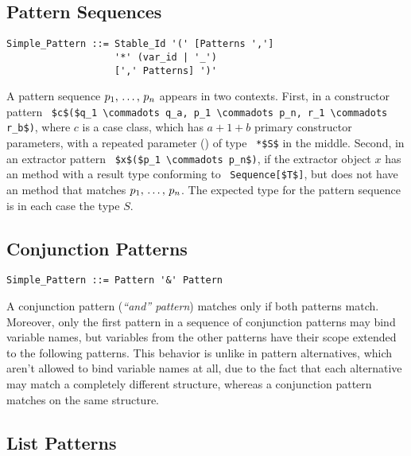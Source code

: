 \subsection{Pattern Sequences}
\label{sec:pattern-sequences}

\syntax\begin{lstlisting}
Simple_Pattern ::= Stable_Id '(' [Patterns ','] 
                   '*' (var_id | '_')
                   [',' Patterns] ')'
\end{lstlisting}

A pattern sequence $p_1 ,\, \ldots ,\, p_n$ appears in two contexts. First, in a constructor pattern ~\lstinline!$c$($q_1 \commadots q_a, p_1 \commadots p_n, r_1 \commadots r_b$)!, where $c$ is a case class, which has $a+1+b$ primary constructor parameters, with a repeated parameter () of type ~\lstinline!*$S$! in the middle. Second, in an extractor pattern ~\lstinline!$x$($p_1 \commadots p_n$)!, if the extractor object $x$ has an  method with a result type conforming to ~\lstinline!Sequence[$T$]!, but does not have an  method that matches $p_1 ,\, \ldots ,\, p_n$. The expected type for the pattern sequence is in each case the type $S$. 







\subsection{Conjunction Patterns}
\label{sec:conjunction-patterns}

\syntax\begin{lstlisting}
Simple_Pattern ::= Pattern '&' Pattern
\end{lstlisting}

A conjunction pattern ({\em {\normalfont ``and''} pattern}) matches only if both patterns match. Moreover, only the first pattern in a sequence of conjunction patterns may bind variable names, but variables from the other patterns have their scope extended to the following patterns. This behavior is unlike in pattern alternatives, which aren't allowed to bind variable names at all, due to the fact that each alternative may match a completely different structure, whereas a conjunction pattern matches on the same structure. 





\subsection{List Patterns}
\label{sec:list-patterns}


